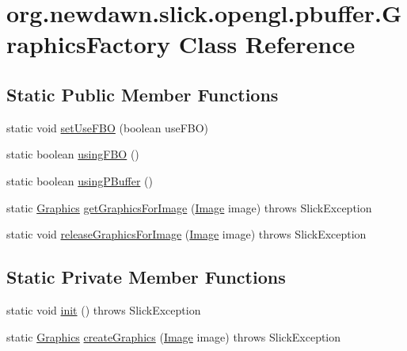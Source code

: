 \hypertarget{classorg_1_1newdawn_1_1slick_1_1opengl_1_1pbuffer_1_1_graphics_factory}{}\section{org.\+newdawn.\+slick.\+opengl.\+pbuffer.\+Graphics\+Factory Class Reference}
\label{classorg_1_1newdawn_1_1slick_1_1opengl_1_1pbuffer_1_1_graphics_factory}
\subsection*{Static Public Member Functions}
\begin{DoxyCompactItemize}
\item 
static void \mbox{\hyperlink{classorg_1_1newdawn_1_1slick_1_1opengl_1_1pbuffer_1_1_graphics_factory_aff9664944bc477fc362c607ec842d9ec}{set\+Use\+F\+BO}} (boolean use\+F\+BO)
\item 
static boolean \mbox{\hyperlink{classorg_1_1newdawn_1_1slick_1_1opengl_1_1pbuffer_1_1_graphics_factory_a8f59891b057912c68edd1877fbc9b157}{using\+F\+BO}} ()
\item 
static boolean \mbox{\hyperlink{classorg_1_1newdawn_1_1slick_1_1opengl_1_1pbuffer_1_1_graphics_factory_a42836bb0632b387c81dbf7adb345f03a}{using\+P\+Buffer}} ()
\item 
static \mbox{\hyperlink{classorg_1_1newdawn_1_1slick_1_1_graphics}{Graphics}} \mbox{\hyperlink{classorg_1_1newdawn_1_1slick_1_1opengl_1_1pbuffer_1_1_graphics_factory_a4607d79d1a18b06242ce69a006e2d5e5}{get\+Graphics\+For\+Image}} (\mbox{\hyperlink{classorg_1_1newdawn_1_1slick_1_1_image}{Image}} image)  throws Slick\+Exception 
\item 
static void \mbox{\hyperlink{classorg_1_1newdawn_1_1slick_1_1opengl_1_1pbuffer_1_1_graphics_factory_a333ffcd0ae5c7754b5973a7a0b0da69c}{release\+Graphics\+For\+Image}} (\mbox{\hyperlink{classorg_1_1newdawn_1_1slick_1_1_image}{Image}} image)  throws Slick\+Exception 
\end{DoxyCompactItemize}
\subsection*{Static Private Member Functions}
\begin{DoxyCompactItemize}
\item 
static void \mbox{\hyperlink{classorg_1_1newdawn_1_1slick_1_1opengl_1_1pbuffer_1_1_graphics_factory_aec2bf827e33a06307b20dc8470c53bca}{init}} ()  throws Slick\+Exception 
\item 
static \mbox{\hyperlink{classorg_1_1newdawn_1_1slick_1_1_graphics}{Graphics}} \mbox{\hyperlink{classorg_1_1newdawn_1_1slick_1_1opengl_1_1pbuffer_1_1_graphics_factory_a1723770d9690868f06dbac9f7742eef9}{create\+Graphics}} (\mbox{\hyperlink{classorg_1_1newdawn_1_1slick_1_1_image}{Image}} image)  throws Slick\+Exception 
\end{DoxyCompactItemize}
